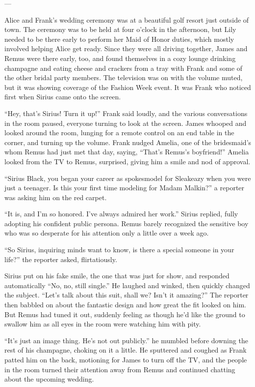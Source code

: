\documentclass[12pt,twoside,openright]{memoir}
\begin{document}
---

Alice and Frank's wedding ceremony was at a beautiful golf resort just outside of town. The ceremony was to be held at four o'clock in the afternoon, but Lily needed to be there early to perform her Maid of Honor duties, which mostly involved helping Alice get ready. Since they were all driving together, James and Remus were there early, too, and found themselves in a cozy lounge drinking champagne and eating cheese and crackers from a tray with Frank and some of the other bridal party members. The television was on with the volume muted, but it was showing coverage of the Fashion Week event. It was Frank who noticed first when Sirius came onto the screen.

``Hey, that's Sirius! Turn it up!'' Frank said loudly, and the various conversations in the room paused, everyone turning to look at the screen. James whooped and looked around the room, lunging for a remote control on an end table in the corner, and turning up the volume. Frank nudged Amelia, one of the bridesmaid's whom Remus had just met that day, saying, ``That's Remus's boyfriend!'' Amelia looked from the TV to Remus, surprised, giving him a smile and nod of approval. 

``Sirius Black, you began your career as spokesmodel for Sleakeazy when you were just a teenager. Is this your first time modeling for Madam Malkin?'' a reporter was asking him on the red carpet.

``It is, and I'm so honored. I've always admired her work.'' Sirius replied, fully adopting his confident public persona. Remus barely recognized the sensitive boy who was so desperate for his attention only a little over a week ago. 

``So Sirius, inquiring minds want to know, is there a special someone in your life?'' the reporter asked, flirtatiously. 

Sirius put on his fake smile, the one that was just for show, and responded automatically ``No, no, still single.'' He laughed and winked, then quickly changed the subject. ``Let's talk about this suit, shall we? Isn't it amazing?'' The reporter then babbled on about the fantastic design and how great the fit looked on him. But Remus had tuned it out, suddenly feeling as though he'd like the ground to swallow him as all eyes in the room were watching him with pity.

``It's just an image thing. He's not out publicly.'' he mumbled before downing the rest of his champagne, choking on it a little. He sputtered and coughed as Frank patted him on the back, motioning for James to turn off the TV, and the people in the room turned their attention away from Remus and continued chatting about the upcoming wedding. 
\end{document}
